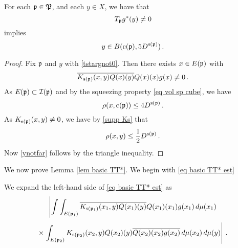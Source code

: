 \begin{lemma}\label{lem tstarsupport}
    For each $\mathfrak p\in \mathfrak P$, and each $y\in X$, we have that
\begin{equation}\label{tstargnot0}
     T_{\mathfrak p} g^*(y)\neq 0
\end{equation}
   implies
\begin{equation}\label{ynotfar}
    y\in  B(\mathrm{c}(\mathfrak p),5D^{\mathrm{s}(\mathfrak p)})\, .
\end{equation}
\end{lemma}
\begin{proof}
Fix $\mathfrak p$ and $y$ with \eqref{tstargnot0}.
Then there exists $x\in E(\mathfrak p)$ with
\begin{equation}
   \overline{K_{\mathrm{s}(\mathfrak p)}(x,y)}\overline{{Q}(x)(y)}
    {Q}(x)(x)g(x) \neq 0\, .
\end{equation}
As $E(\mathfrak p)\subset \mathcal{I}(\mathfrak p)$ and by the squeezing property
\eqref{eq vol sp cube}, we have
\begin{equation}
    \rho(x,\mathrm{c}(\mathfrak p))\le 4D^{\mathrm{s}(\mathfrak p)}\, .
\end{equation}
As $K_{\mathrm{s}(\mathfrak p)}(x,y)\neq 0$, we have by  \eqref{supp Ks}
that
\begin{equation}
\rho(x,y)\le \frac 12 D^{\mathrm{s}(\mathfrak p)}\, .
\end{equation}
Now \eqref{ynotfar} follows by the triangle inequality.
\end{proof}


We now prove Lemma \ref{lem basic TT*}. We begin with  \eqref{eq basic TT* est}

We expand the left-hand side of \eqref{eq basic TT* est} as
\begin{equation}\label{tstartstar}
\left|\int \int_{E(\mathfrak p_1)} \overline{K_{\mathrm{s}(\mathfrak p_1)}(x_1,y)}\overline{{Q}(x_1)(y)}
    {Q}(x_1)(x_1)g(x_1)\, d\mu(x_1) \right.
\end{equation}
\begin{equation}
 \times \left.\int_{E(\mathfrak p_2)} {K_{\mathrm{s}(\mathfrak p_2)}(x_2,y)}{{Q}(x_2)(y)}
    \overline{{Q}(x_2)(x_2)}\overline{g(x_2)}\, d\mu(x_2)\, d\mu(y)\right|\, .
\end{equation}

